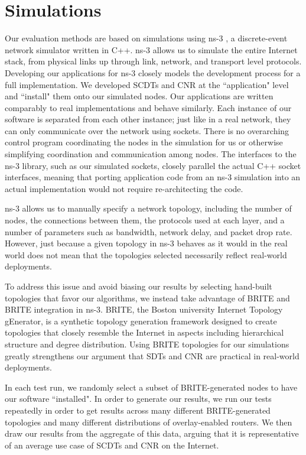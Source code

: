 \chapter{Simulations}
\label{simulations}
Our evaluation methods are based on simulations using ns-3 \cite{ns3}, a discrete-event network simulator written in C++. ns-3 allows us to simulate the entire Internet stack, from physical links up through link, network, and transport level protocols. Developing our applications for ns-3 closely models the development process for a full implementation. We developed SCDTs and CNR at the ``application" level and ``install" them onto our simulated nodes. Our applications are written comparably to real implementations and behave similarly. Each instance of our software is separated from each other instance; just like in a real network, they can only communicate over the network using sockets. There is no overarching control program coordinating the nodes in the simulation for us or otherwise simplifying coordination and communication among nodes. The interfaces to the ns-3 library, such as our simulated sockets, closely parallel the actual C++ socket interfaces, meaning that porting application code from an ns-3 simulation into an actual implementation would not require re-architecting the code.

ns-3 allows us to manually specify a network topology, including the number of nodes, the connections between them, the protocols used at each layer, and a number of parameters such as bandwidth, network delay, and packet drop rate. However, just because a given topology in ns-3 behaves as it would in the real world does not mean that the topologies selected necessarily reflect real-world deployments.

To address this issue and avoid biasing our results by selecting hand-built topologies that favor our algorithms, we instead take advantage of BRITE \cite{brite} and BRITE integration in ns-3. BRITE, the Boston university Internet Topology gEnerator, is a synthetic topology generation framework \cite{gtitm, inet} designed to create topologies that closely resemble the Internet in aspects including hierarchical structure and degree distribution. Using BRITE topologies for our simulations greatly strengthens our argument that SDTs and CNR are practical in real-world deployments.

In each test run, we randomly select a subset of BRITE-generated nodes to have our software ``installed". In order to generate our results, we run our tests repeatedly in order to get results across many different BRITE-generated topologies and many different distributions of overlay-enabled routers. We then draw our results from the aggregate of this data, arguing that it is representative of an average use case of SCDTs and CNR on the Internet.

